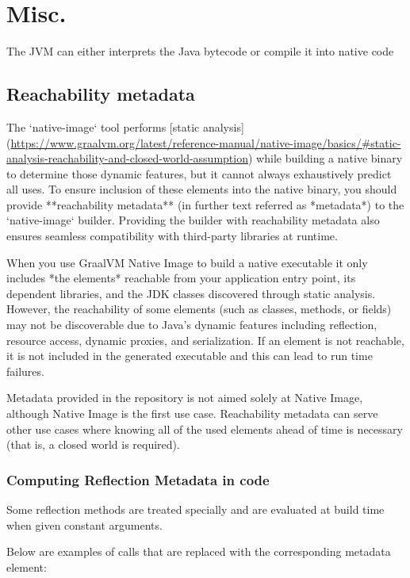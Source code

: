 \chapter{Misc.}
The JVM can either interprets the Java bytecode or compile it into native code
\section{Reachability metadata}

The `native-image` tool performs [static analysis](\url{https://www.graalvm.org/latest/reference-manual/native-image/basics/#static-analysis-reachability-and-closed-world-assumption}) while building a native binary to determine those dynamic features, but it cannot always exhaustively predict all uses.
To ensure inclusion of these elements into the native binary, you should provide **reachability metadata** (in further text referred as *metadata*) to the `native-image` builder. 
Providing the builder with reachability metadata also ensures seamless compatibility with third-party libraries at runtime.

When you use GraalVM Native Image to build a native executable it only includes *the elements* reachable from your application entry point, its dependent libraries, and the JDK classes discovered through static analysis. However, the reachability of some elements (such as classes, methods, or fields) may not be discoverable due to Java’s dynamic features including reflection, resource access, dynamic proxies, and serialization. If an element is not reachable, it is not included in the generated executable and this can lead to run time failures.

Metadata provided in the repository is not aimed solely at Native Image, although Native Image is the first use case. Reachability metadata can serve other use cases where knowing all of the used elements ahead of time is necessary (that is, a closed world is required).

\subsection{Computing Reflection Metadata in code}

Some reflection methods are treated specially and are evaluated at build time when given constant arguments.

Below are examples of calls that are replaced with the corresponding metadata element:

